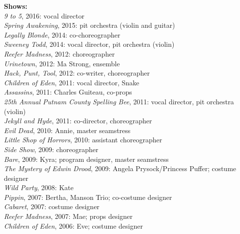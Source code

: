 \documentclass[]{friggeri-cv}
\begin{document}
\begin{entrylist}
{\begin{itemize}
	\end{itemize}
	\textbf{Shows:}\\
	\emph{9 to 5}, 2016: vocal director\\
	\emph{Spring Awakening}, 2015: pit orchestra (violin and guitar)\\
	\emph{Legally Blonde}, 2014: co-choreographer\\
	\emph{Sweeney Todd}, 2014: vocal director, pit orchestra (violin)\\
	\emph{Reefer Madness}, 2012: choreographer\\
	\emph{Urinetown}, 2012: Ma Strong, ensemble\\
	\emph{Hack, Punt, Tool}, 2012: co-writer, choreographer\\
	\emph{Children of Eden}, 2011: vocal director, Snake\\
	\emph{Assassins}, 2011: Charles Guiteau, co-props\\
	\emph{25th Annual Putnam County Spelling Bee}, 2011: vocal director, pit orchestra (violin)\\
	\emph{Jekyll and Hyde}, 2011: co-director, choreographer\\
	\emph{Evil Dead}, 2010: Annie, master seamstress\\
	\emph{Little Shop of Horrors}, 2010: assistant choreographer\\
	\emph{Side Show}, 2009: choreographer\\
	\emph{Bare}, 2009: Kyra; program designer, master seamstress\\
	\emph{The Mystery of Edwin Drood}, 2009: Angela Prysock/Princess Puffer; costume designer\\
	\emph{Wild Party}, 2008: Kate\\
	\emph{Pippin}, 2007: Bertha, Manson Trio; co-costume designer\\
	\emph{Cabaret}, 2007: costume designer\\
	\emph{Reefer Madness}, 2007: Mae; props designer\\
	\emph{Children of Eden}, 2006: Eve; costume designer\\
}
\end{entrylist}
\end{document}
